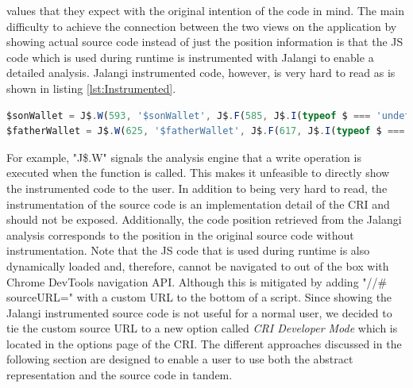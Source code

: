 values that they expect with the original intention of the code in mind. The main difficulty to achieve the connection between the two views on the application by showing actual source code instead of just the position information is that the JS code which is used during runtime is instrumented with Jalangi to enable a detailed analysis. Jalangi instrumented code, however, is very hard to read as is shown in listing \ref{lst:Instrumented}.

\begin{lstlisting}[language=JavaScript, caption={Example of RxJS code.},label={lst:Instrumented}]
$sonWallet = J$.W(593, '$sonWallet', J$.F(585, J$.I(typeof $ === 'undefined' ? $ = J$.R(569, '$', undefined, true, true) : $ = J$.R(569, '$', $, true, true)), false)(J$.T(577, '#wallet-son', 21, false)), J$.I(typeof $sonWallet === 'undefined' ? undefined : $sonWallet), true, true);
$fatherWallet = J$.W(625, '$fatherWallet', J$.F(617, J$.I(typeof $ === 'undefined' ? $ = J$.R(601, '$', undefined, true, true) : $ = J$.R(601, '$', $, true, true)), false)(J$.T(609, '#wallet-father', 21, false)), J$.I(typeof $fatherWallet === 'undefined' ? undefined : $fatherWallet), true, true);
\end{lstlisting}

For example, "J\$.W" signals the analysis engine that a write operation is executed when the function is called. This makes it unfeasible to directly show the instrumented code to the user. In addition to being very hard to read, the instrumentation of the source code is an implementation detail of the CRI and should not be exposed. Additionally, the code position retrieved from the Jalangi analysis corresponds to the position in the original source code without instrumentation. Note that the JS code that is used during runtime is also dynamically loaded and, therefore, cannot be navigated to out of the box with Chrome DevTools navigation API. Although this is mitigated by adding "//\# sourceURL=" with a custom URL to the bottom of a script. Since showing the Jalangi instrumented source code is not useful for a normal user, we decided to tie the custom source URL to a new option called \emph{CRI Developer Mode} which is located in the options page of the CRI. The different approaches discussed in the following section are designed to enable a user to use both the abstract representation and the source code in tandem.

